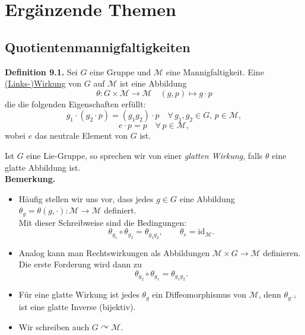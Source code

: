 \documentclass[fleqn, 12pt, letterpaper]{article}
\begin{document}
\section{Ergänzende Themen}
\subsection{Quotientenmannigfaltigkeiten}

\textbf{Definition 9.1.} Sei $G$ eine Gruppe und $\mathcal{M}$ eine Mannigfaltigkeit. Eine \underline{(Links-)Wirkung} von $G$ auf $\mathcal{M}$
ist eine Abbildung 
\[
\theta: G \times \mathcal{M} \to \mathcal{M} \quad (g, p) \mapsto g \cdot p
\]
die die folgenden Eigenschaften erfüllt:
\[
g_1 \cdot (g_2 \cdot p) = (g_1 g_2) \cdot p \quad \forall\, g_1, g_2 \in G,\, p \in \mathcal{M},
\]
\[
e \cdot p = p \quad \forall\, p \in \mathcal{M},
\]
wobei $e$ das neutrale Element von $G$ ist.

Ist $G$ eine Lie-Gruppe, so sprechen wir von einer \emph{glatten Wirkung}, falls $\theta$ eine glatte Abbildung ist.\\

\textbf{Bemerkung.}
\begin{itemize}
    \item Häufig stellen wir uns vor, dass jedes $g \in G$ eine Abbildung $\theta_g = \theta(g, \cdot): \mathcal{M} \to \mathcal{M}$ definiert.\\
    Mit dieser Schreibweise sind die Bedingungen:
    \[
        \theta_{g_1} \circ \theta_{g_2} = \theta_{g_1 g_2}, \qquad \theta_e = \mathrm{id}_{\mathcal{M}}.
    \]
    
    \item Analog kann man Rechtswirkungen als Abbildungen $\mathcal{M} \times G \to \mathcal{M}$ definieren. Die erste Forderung wird dann zu
    \[
        \theta_{g_2} \circ \theta_{g_1} = \theta_{g_1 g_2}.
    \]

    \item Für eine glatte Wirkung ist jedes $\theta_g$ ein Diffeomorphismus von $\mathcal{M}$, denn $\theta_{g^{-1}}$ ist eine glatte Inverse (bijektiv).

    \item Wir schreiben auch $G \curvearrowright \mathcal{M}$.
\end{itemize}
\end{document}

